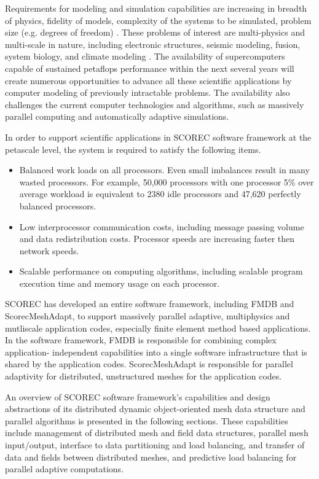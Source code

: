 

Requirements for modeling and simulation capabilities are increasing
in breadth of physics, fidelity of 
models, complexity of the systems to be simulated, problem size
(e.g. degrees of freedom) \cite{TACC}. These 
problems of interest are multi-physics and multi-scale in nature,
including electronic structures, seismic 
modeling, fusion, system biology, and climate modeling \cite{LLNL}.
The availability of supercomputers 
capable of sustained petaflops performance within the next several
years will create numerous opportunities 
to advance all these scientific applications by computer modeling of
previously intractable problems. The 
availability also challenges the current computer technologies and
algorithms, such as massively parallel 
computing and automatically adaptive simulations. 

In order to support scientific applications in SCOREC software framework at the petascale level, the system is 
required to satisfy the following items. 
\begin{itemize}

\item Balanced work loads on all processors. Even small imbalances
  result in many wasted processors. For 
example, 50,000 processors with one processor 5\% over average workload
				 is equivalent to 2380 idle
				processors 
and 47,620 perfectly balanced processors\cite{devine}.

\item Low interprocessor communication costs, including message
  passing volume and data redistribution costs. 
Processor speeds are increasing faster then network speeds.   

\item Scalable performance on computing algorithms, including scalable
  program execution time and memory 
usage on each processor. 
\end{itemize}

SCOREC has developed an entire software framework, including FMDB and ScorecMeshAdapt,  to 
support massively parallel adaptive, multiphysics and mutliscale
application codes, especially finite element 
method based applications. In the software framework, FMDB is
responsible for combining complex application-
independent capabilities into a single software infrastructure that is
shared by the application codes. 
ScorecMeshAdapt is responsible for parallel adaptivity for distributed,
unstructured meshes for the application codes. 

An overview of SCOREC software framework's capabilities and design abstractions of its
distributed dynamic object-oriented mesh 
data structure and parallel algorithms is presented in the following sections. These
capabilities include management of 
distributed mesh and field data structures, parallel mesh
input/output, interface to data 
partitioning and load balancing, and
transfer of data and fields between 
distributed meshes, and predictive load balancing for parallel
adaptive computations. 
